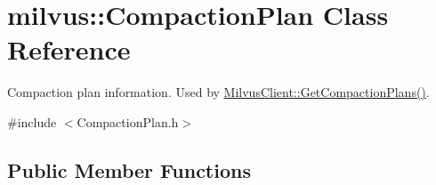 \hypertarget{classmilvus_1_1_compaction_plan}{}\section{milvus\+:\+:Compaction\+Plan Class Reference}
\label{classmilvus_1_1_compaction_plan}


Compaction plan information. Used by \hyperlink{classmilvus_1_1_milvus_client_a39d54736f4b08bba8d6b055277aa71ea}{Milvus\+Client\+::\+Get\+Compaction\+Plans()}.  




{\ttfamily \#include $<$Compaction\+Plan.\+h$>$}

\subsection*{Public Member Functions}
